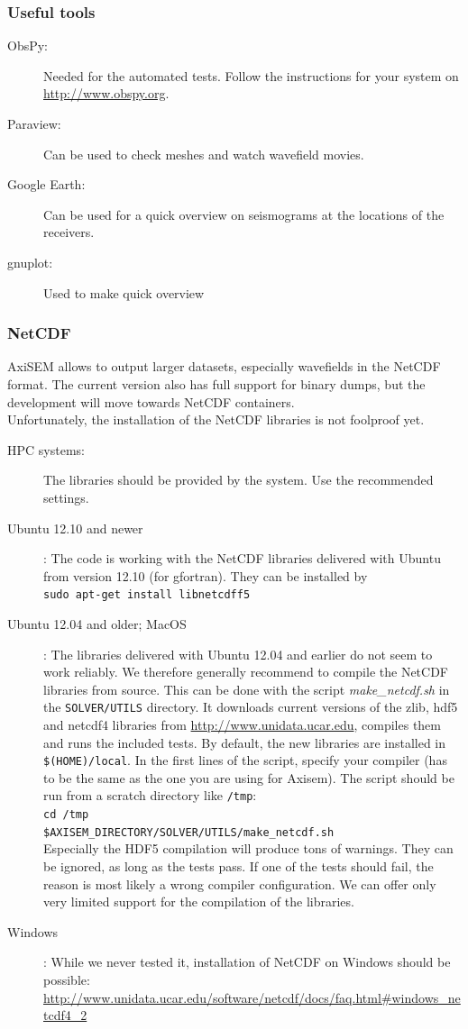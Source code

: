 \documentclass{article}
\begin{document}
\subsubsection{Useful tools}
\begin{description}
 \item[ObsPy:] Needed for the automated tests. Follow the instructions for your system on \url{http://www.obspy.org}.
 \item[Paraview:] Can be used to check meshes and watch wavefield movies.
 \item[Google Earth:] Can be used for a quick overview on seismograms at the locations of the receivers.
 \item[gnuplot:] Used to make quick overview
\end{description}
\subsubsection{NetCDF}
AxiSEM allows to output larger datasets, especially wavefields in the NetCDF format. The current version also has full support for binary dumps, but the development will move towards NetCDF containers.\\
Unfortunately, the installation of the NetCDF libraries is not foolproof yet.
\begin{description}
 \item[HPC systems:] The libraries should be provided by the system. Use the recommended settings.
 \item[Ubuntu 12.10 and newer]: The code is working with the NetCDF libraries delivered with Ubuntu from version 12.10 (for gfortran). They can be installed by \\
 \verb|sudo apt-get install libnetcdff5|
 \item[Ubuntu 12.04 and older; MacOS]: The libraries delivered with Ubuntu 12.04 and earlier do not seem to work reliably. We therefore generally recommend to compile the NetCDF libraries from source. This can be done with the script \textit{make\_netcdf.sh} in the \verb|SOLVER/UTILS| directory. It downloads current versions of the zlib, hdf5 and netcdf4 libraries from \url{http://www.unidata.ucar.edu}, compiles them and runs the included tests. By default, the new libraries are installed in \verb|$(HOME)/local|. In the first lines of the script, specify your compiler (has to be the same as the one you are using for Axisem). The script should be run from a scratch directory like \verb|/tmp|:\\
 \verb|cd /tmp|\\
 \verb|$AXISEM_DIRECTORY/SOLVER/UTILS/make_netcdf.sh|\\
 Especially the HDF5 compilation will produce tons of warnings. They can be ignored, as long as the tests pass. If one of the tests should fail, the reason is most likely a wrong compiler configuration. We can offer only very limited support for the compilation of the libraries. 
 \item[Windows]: While we never tested it, installation of NetCDF on Windows should be possible:
 \url{http://www.unidata.ucar.edu/software/netcdf/docs/faq.html#windows_netcdf4_2}
\end{description}
\end{document}
